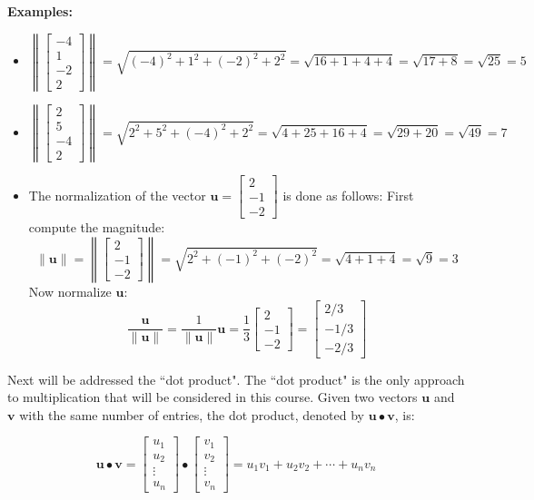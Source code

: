 \documentclass{article}
\begin{document}
\textbf{Examples:}
\begin{itemize}
\item 
\[\left\|\begin{bmatrix} -4 \\ 1 \\ -2 \\ 2 \end{bmatrix}\right\| = \sqrt{(-4)^2 + 1^2 + (-2)^2 + 2^2} = \sqrt{16 + 1 + 4 + 4} = \sqrt{17 + 8} = \sqrt{25} = 5\]
\item 
\[\left\|\begin{bmatrix} 2 \\ 5 \\ -4 \\ 2 \end{bmatrix}\right\| = \sqrt{2^2 + 5^2 + (-4)^2 + 2^2} = \sqrt{4 + 25 + 16 + 4} = \sqrt{29 + 20} = \sqrt{49} = 7\]
\item 
The normalization of the vector \(\mathbf{u} = \begin{bmatrix} 2 \\ -1 \\ -2 \end{bmatrix}\) is done as follows: First compute the magnitude:
\[\|\mathbf{u}\| = \left\|\begin{bmatrix} 2 \\ -1 \\ -2 \end{bmatrix}\right\| = \sqrt{2^2 + (-1)^2 + (-2)^2} = \sqrt{4 + 1 + 4} = \sqrt{9} = 3\]  
Now normalize \(\mathbf{u}\):
\[\frac{\mathbf{u}}{\|\mathbf{u}\|} 
= \frac{1}{\|\mathbf{u}\|}\mathbf{u}   
= \frac{1}{3}\begin{bmatrix} 2 \\ -1 \\ -2 \end{bmatrix}
= \begin{bmatrix} 2/3 \\ -1/3 \\ -2/3 \end{bmatrix}\]
\end{itemize}

Next will be addressed the ``dot product". The ``dot product" is the only approach to multiplication that will be considered in this course. Given two vectors \(\mathbf{u}\) and \(\mathbf{v}\) with the same number of entries, the dot product, denoted by \(\mathbf{u} \bullet \mathbf{v}\), is:

\[\mathbf{u} \bullet \mathbf{v} = \begin{bmatrix} u_1 \\ u_2 \\ \vdots \\ u_n \end{bmatrix} \bullet \begin{bmatrix} v_1 \\ v_2 \\ \vdots \\ v_n \end{bmatrix} = u_1 v_1 + u_2 v_2 + \cdots + u_n v_n\]
\end{document}
